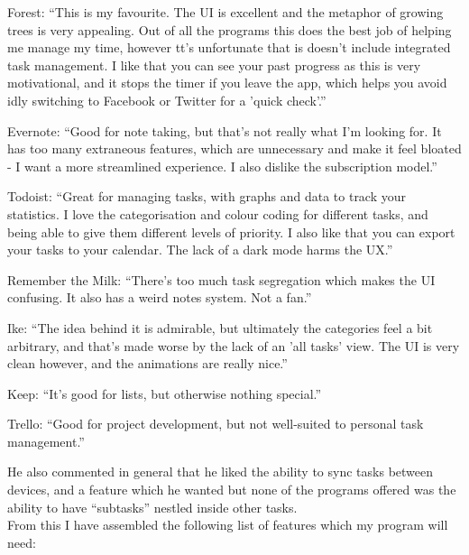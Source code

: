 \documentclass{article}
\begin{document}
\begin{description}
\item Forest: ``This is my favourite. The UI is excellent and the metaphor of
  growing trees is very appealing. Out of all the programs this does the best
  job of helping me manage my time, however tt's unfortunate that is doesn't
  include integrated task management. I like that you can see your past progress
  as this is very motivational, and it stops the timer if you leave the app,
  which helps you avoid idly switching to Facebook or Twitter for a 'quick
  check'.''
\item Evernote: ``Good for note taking, but that's not really what I'm looking
  for. It has too many extraneous features, which are unnecessary and make it
  feel bloated - I want a more streamlined experience. I also dislike the
  subscription model.''
\item Todoist: ``Great for managing tasks, with graphs and data to track your
  statistics. I love the categorisation and colour coding for different tasks,
  and being able to give them different levels of priority. I also like that you
  can export your tasks to your calendar. The lack of a dark mode harms the
  UX.''
\item Remember the Milk: ``There's too much task segregation which makes the UI
  confusing. It also has a weird notes system. Not a fan.''
\item Ike: ``The idea behind it is admirable, but ultimately the categories feel
  a bit arbitrary, and that's made worse by the lack of an 'all tasks' view. The
  UI is very clean however, and the animations are really nice.''
\item Keep: ``It's good for lists, but otherwise nothing special.''
\item Trello: ``Good for project development, but not well-suited to personal
  task management.''
\end{description}

He also commented in general that he liked the ability to sync tasks between
devices, and a feature which he wanted but none of the programs offered was the
ability to have ``subtasks'' nestled inside other tasks.\\

From this I have assembled the following list of features which my program will
need:
\end{document}
